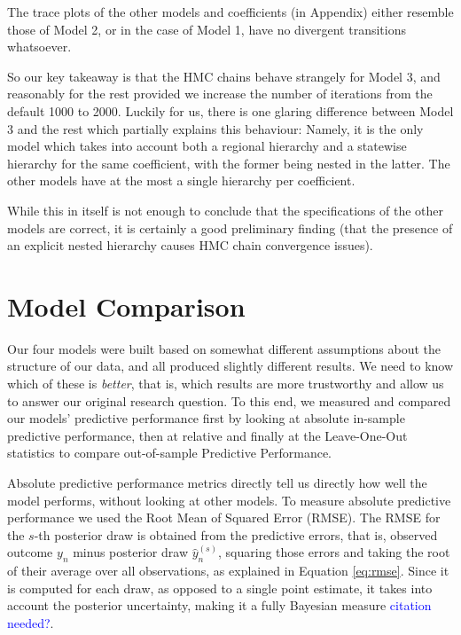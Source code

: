 \documentclass[12pt]{article}
\newcommand{\blue}[1]{\textcolor{blue}{#1}}
\begin{document}
The trace plots of the other models and coefficients (in Appendix) either resemble those of Model 2, or in the case of Model 1, have no divergent transitions whatsoever.

So our key takeaway is that the HMC chains behave strangely for Model 3, and reasonably for the rest provided we increase the number of iterations from the default 1000 to 2000. Luckily for us, there is one glaring difference between Model 3 and the rest which partially explains this behaviour: Namely, it is the only model which takes into account both a regional hierarchy and a statewise hierarchy for the same coefficient, with the former being nested in the latter. The other models have at the most a single hierarchy per coefficient. 

While this in itself is not enough to conclude that the specifications of the other models are correct, it is certainly a good preliminary finding (that the presence of an explicit nested hierarchy causes HMC chain convergence issues). 


\section{Model Comparison}


Our four models were built based on somewhat different assumptions about the structure of our data, and all produced slightly different results. We need to know which of these is \textit{better}, that is, which results are more trustworthy and allow us to answer our original research question.
To this end, we measured and compared our models' predictive performance first by looking at absolute in-sample predictive performance, then at relative and finally at the Leave-One-Out statistics to compare out-of-sample Predictive Performance.


Absolute predictive performance metrics directly tell us directly how well the model performs, without looking at other models.
To measure absolute predictive performance we used the Root Mean of Squared Error (RMSE). The RMSE for the $s$-th posterior draw is obtained from the predictive errors, that is, observed outcome $y_n$ minus posterior draw $\hat{y}_n^{(s)}$, squaring those errors and taking the root of their average over all observations, as explained in Equation \ref{eq:rmse}.
Since it is computed for each draw, as opposed to a single point estimate, it takes into account the posterior uncertainty, making it a fully Bayesian measure \blue{citation needed?}.
\end{document}
